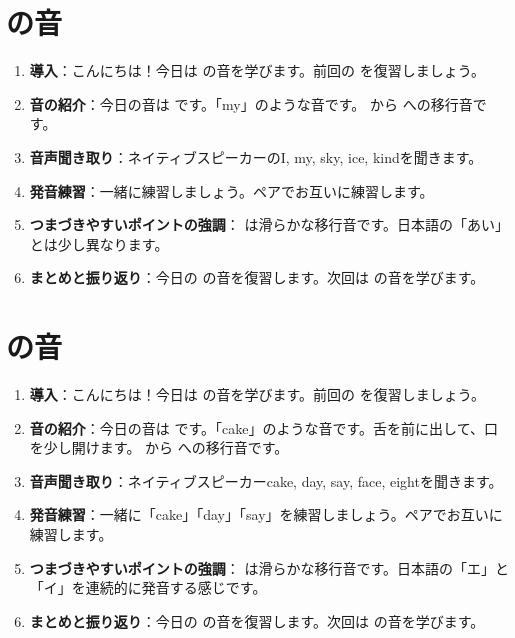 \documentclass[book,jafontscale=0.9247]{jlreq}
\begin{document}
\section{ の音}
\begin{enumerate}
     \item \textbf{導入}：こんにちは！今日は  の音を学びます。前回の  を復習しましょう。
    \item \textbf{音の紹介}：今日の音は  です。「my」のような音です。  から  への移行音です。
    \item \textbf{音声聞き取り}：ネイティブスピーカーのI, my, sky, ice, kindを聞きます。
    \item \textbf{発音練習}：一緒に練習しましょう。ペアでお互いに練習します。
    \item \textbf{つまづきやすいポイントの強調}：  は滑らかな移行音です。日本語の「あい」とは少し異なります。
    \item \textbf{まとめと振り返り}：今日の  の音を復習します。次回は  の音を学びます。
\end{enumerate}
\section{ の音}
\begin{enumerate}
    \item \textbf{導入}：こんにちは！今日は  の音を学びます。前回の  を復習しましょう。
    \item \textbf{音の紹介}：今日の音は  です。「cake」のような音です。舌を前に出して、口を少し開けます。  から  への移行音です。
    \item \textbf{音声聞き取り}：ネイティブスピーカーcake, day, say, face, eightを聞きます。
    \item \textbf{発音練習}：一緒に「cake」「day」「say」を練習しましょう。ペアでお互いに練習します。
    \item \textbf{つまづきやすいポイントの強調}：  は滑らかな移行音です。日本語の「エ」と「イ」を連続的に発音する感じです。
    \item \textbf{まとめと振り返り}：今日の  の音を復習します。次回は  の音を学びます。
\end{enumerate}
\end{document}
